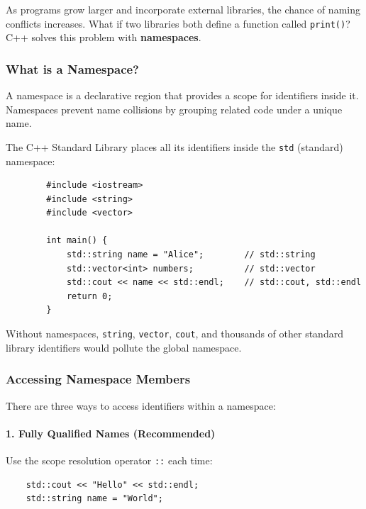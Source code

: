 As programs grow larger and incorporate external libraries, the chance of naming conflicts increases. What if two libraries both define a function called \texttt{print()}? C++ solves this problem with \textbf{namespaces}.

\subsubsection{What is a Namespace?}

A namespace is a declarative region that provides a scope for identifiers inside it. Namespaces prevent name collisions by grouping related code under a unique name.

\begin{example}{\leavevmode}
	
	The C++ Standard Library places all its identifiers inside the \texttt{std} (standard) namespace:
	
	\begin{lstlisting}
		#include <iostream>
		#include <string>
		#include <vector>
		
		int main() {
			std::string name = "Alice";        // std::string
			std::vector<int> numbers;          // std::vector
			std::cout << name << std::endl;    // std::cout, std::endl
			return 0;
		}
	\end{lstlisting}
	
	Without namespaces, \texttt{string}, \texttt{vector}, \texttt{cout}, and thousands of other standard library identifiers would pollute the global namespace.
\end{example}

\subsubsection{Accessing Namespace Members}

There are three ways to access identifiers within a namespace:

\paragraph{1. Fully Qualified Names (Recommended)}

Use the scope resolution operator \texttt{::} each time:

\begin{lstlisting}
	std::cout << "Hello" << std::endl;
	std::string name = "World";
\end{lstlisting}

